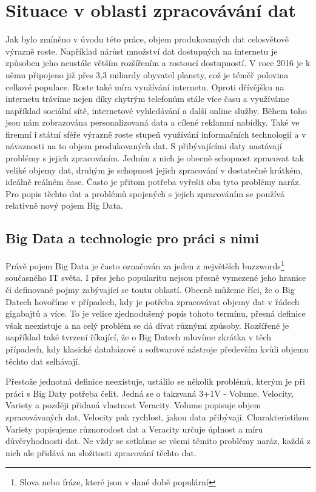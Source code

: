 \documentclass[thesis=B,czech]{FITthesis}[2012/06/26]
\begin{document}
\chapter{Situace v oblasti zpracovávání dat}
\label{data-processing}
	Jak bylo zmíněno v úvodu této práce, objem produkovaných dat celosvětově výrazně roste. Například nárůst množství dat dostupných na internetu je způsoben jeho neustále větším rozšířením a rostoucí dostupností. V  roce 2016 je k němu připojeno již přes 3,3 miliardy obyvatel planety\cite{internet-live-stats}, což je téměř polovina celkové populace. Roste také míra využívání internetu. Oproti dřívějšku na internetu trávíme nejen díky chytrým telefonům stále více času a využíváme například sociální sítě, internetové vyhledávání a další online služby. Během toho jsou nám zobrazována personalizovaná data a cílené reklamní nabídky. Také ve firemní i státní sféře výrazně roste stupeň využívání informačních technologií a v návaznosti na to objem produkovaných dat. S přibývajícími daty nastávají problémy s jejich zpracováním. Jedním z nich je obecně schopnost zpracovat tak veliké objemy dat, druhým je schopnost jejich zpracování v dostatečně krátkém, ideálně reálném čase. Často je přitom potřeba vyřešit oba tyto problémy naráz. Pro popis těchto dat a problémů spojených s jejich zpracováním se používá relativně nový pojem Big Data. 

		 
\section{Big Data a technologie pro práci s nimi}
	Právě pojem Big Data je často označován za jeden z největších buzzwords\footnote{Slova nebo fráze, které jsou v dané době populární} současného IT světa. I přes jeho popularitu nejsou přesně vymezené jeho hranice či definované pojmy zabývající se toutu oblastí. Obecně můžeme říci, že o Big Datech hovoříme v případech, kdy je potřeba zpracovávat objemy dat v řádech gigabajtů a více. To je velice zjednodušený popis tohoto termínu, přesná definice však neexistuje a na celý problém se dá dívat různými způsoby. Rozšířené je například také tvrzení říkající, že o Big Datech mluvíme zkrátka v těch případech, kdy klasické databázové a softwarové nástroje především kvůli objemu těchto dat selhávají\cite{webopedia-bigdata}. 

	Přestože jednotná definice neexistuje, ustálilo se několik problémů, kterým je při práci s Big Daty potřeba čelit. Jedná se o takzvaná 3+1V - Volume, Velocity, Variety a později přidaná vlastnost Veracity\cite{dp-customer-inteligence}. Volume popisuje objem zpracovávaných dat, Velocity pak rychlost, jakou data přibývají. Charakteristikou Variety popisujeme různorodost dat a Veracity určuje úplnost a míru důvěryhodnosti dat. Ne vždy se setkáme se všemi těmito problémy naráz, každá z nich ale přidává na složitosti zpracování těchto dat. 
	
\end{document}
